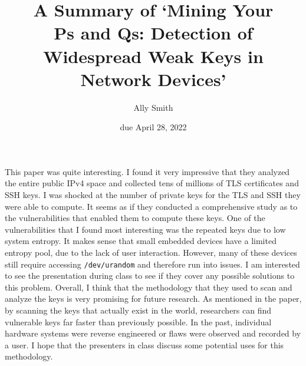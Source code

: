 \documentclass[12pt]{article}
\title{\bf A Summary of `Mining Your \\Ps and Qs: Detection of
Widespread Weak Keys in Network Devices'}
\author{Ally Smith}
\date{due April 28, 2022}
\begin{document}
\maketitle{}

This paper was quite interesting. I found it very impressive that they analyzed
the entire public IPv4 space and collected tens of millions of TLS certificates
and SSH keys. I was shocked at the number of private keys for the TLS and SSH
they were able to compute. It seems as if they conducted a comprehensive study
as to the vulnerabilities that enabled them to compute these keys. One of the
vulnerabilities that I found most interesting was the repeated keys due to low
system entropy. It makes sense that small embedded devices have a limited
entropy pool, due to the lack of user interaction. However, many of these
devices still require accessing \texttt{/dev/urandom} and therefore run into
issues. I am interested to see the presentation during class to see if they
cover any possible solutions to this problem. Overall, I think that the
methodology that they used to scan and analyze the keys is very promising for
future research. As mentioned in the paper, by scanning the keys that actually
exist in the world, researchers can find vulnerable keys far faster than
previously possible. In the past, individual hardware systems were reverse
engineered or flaws were observed and recorded by a user. I hope that the
presenters in class discuss some potential uses for this methodology.
\end{document}
